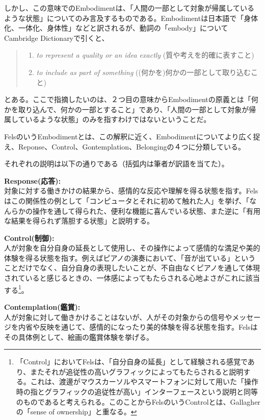 しかし、この意味でのEmbodimentは、「人間の一部として対象が帰属しているような状態」についてのみ言及するものである。Embodimentは日本語で「身体化、一体化、身体性」などと訳されるが、動詞の「embody」についてCambridge Dictionaryで引くと、
\begin{quote}
  \begin{enumerate}
    \item \textit{to represent a quality or an idea exactly} (質や考えを的確に表すこと) 
    \item \textit{to include as part of something} ((何かを)何かの一部として取り込むこと)
  \end{enumerate}
\end{quote}
とある\cite{embody}。ここで指摘したいのは、２つ目の意味からEmbodimentの原義とは「何かを取り込んで、何かの一部とすること」であり、「人間の一部として対象が帰属しているような状態」のみを指すわけではないということだ。

FelsのいうEmbodimentとは、この解釈に近く、Embodimentについてより広く捉え、Reponse、Control、Gontemplation、Belongingの４つに分類している\cite{Fels, Costello2005}。

それぞれの説明は以下の通りである（括弧内は筆者が訳語を当てた）。

\textbf{Response(応答):}\\
対象に対する働きかけの結果から、感情的な反応や理解を得る状態を指す。Felsはこの関係性の例として「コンピュータとそれに初めて触れた人」を挙げ、「なんらかの操作を通して得られた、便利な機能に喜んでいる状態、また逆に「有用な結果を得られず落胆する状態」と説明する。

\textbf{Control(制御):}\\
人が対象を自分自身の延長として使用し、その操作によって感情的な満足や美的体験を得る状態を指す。例えばピアノの演奏において、「音が出ている」ということだけでなく、自分自身の表現したいことが、不自由なくピアノを通して体現されていると感じるときの、一体感によってもたらされる心地よさがこれに該当する\footnote{「Control」においてFelsは、「自分自身の延長」として経験される感覚であり、またそれが追従性の高いグラフィックによってもたらされると説明する。これは、渡邊がマウスカーソルやスマートフォンに対して用いた「操作時の指とグラフィックの追従性が高い」インターフェースという説明と同等のものであると考えられる。このことからFelsのいうControlとは、Gallagherの「sense of ownership」と重なる。}。

\textbf{Contemplation(鑑賞):}\\
人が対象に対して働きかけることはないが、人がその対象からの信号やメッセージを内省や反映を通じて、感情的になったり美的体験を得る状態を指す。Felsはその具体例として、絵画の鑑賞体験を挙げる。

